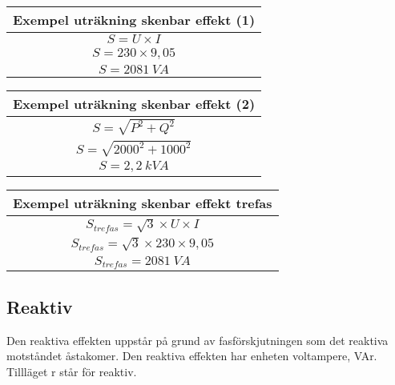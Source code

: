 \documentclass[
]{book}
\begin{document}
\begin{longtable}[]{@{}c@{}}
\toprule()
Exempel uträkning skenbar effekt (1) \\
\midrule()
\endhead
\( S=U \times I \) \\
\( S=230 \times 9,05 \) \\
\( S=2081 \ VA \) \\
\bottomrule()
\end{longtable}

\begin{longtable}[]{@{}c@{}}
\toprule()
Exempel uträkning skenbar effekt (2) \\
\midrule()
\endhead
\( S= \sqrt{P^2 + Q^2} \) \\
\( S= \sqrt{2000^2 + 1000^2} \) \\
\( S=2,2 \ kVA \) \\
\bottomrule()
\end{longtable}

\begin{longtable}[]{@{}c@{}}
\toprule()
Exempel uträkning skenbar effekt trefas \\
\midrule()
\endhead
\( S_{trefas}= \sqrt{3} \times U \times I \) \\
\( S_{trefas}= \sqrt{3} \times 230 \times 9,05 \) \\
\( S_{trefas}=2081 \ VA \) \\
\bottomrule()
\end{longtable}

\hypertarget{reaktiv}{%
\subsection{Reaktiv}\label{reaktiv}}

Den reaktiva effekten uppstår på grund av fasförskjutningen som det reaktiva motståndet åstakomer. Den reaktiva effekten har enheten voltampere, VAr. Tillläget r står för reaktiv.
\end{document}
